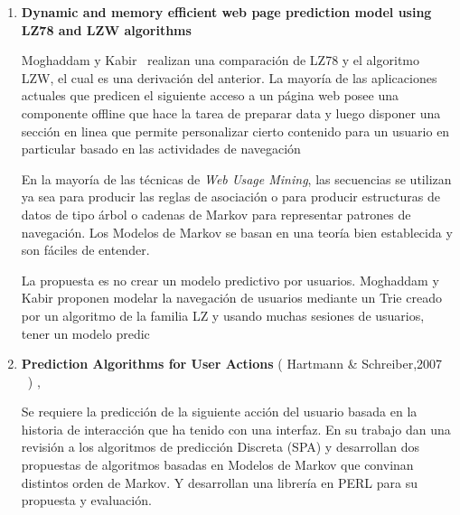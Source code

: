\vspace{1cm}
\begin{enumerate}


  \item \textbf{Dynamic and memory efficient web page prediction model using LZ78 and LZW algorithms }

	Moghaddam y Kabir~\cite{Moghaddam2009}  realizan una comparación de LZ78  y el algoritmo LZW, el cual es una derivación del anterior. La mayoría de las aplicaciones actuales que predicen el siguiente acceso a un página web posee una  componente offline que hace la tarea de preparar data y luego disponer una sección en linea que permite personalizar cierto contenido para un usuario en particular basado en las actividades de navegación
	
	En la mayoría de las técnicas de \emph{Web Usage Mining}, las secuencias se utilizan ya sea para producir las reglas de asociación o para producir estructuras de datos de tipo árbol o cadenas de Markov para representar patrones de navegación. Los  Modelos de Markov se basan en una teoría bien establecida y son fáciles de entender.  
	

	La propuesta es no crear un modelo predictivo por usuarios.
	Moghaddam y Kabir proponen modelar la navegación de usuarios mediante un Trie creado por un algoritmo de la familia LZ y usando muchas sesiones de usuarios, tener un modelo predic






  \item \textbf{Prediction Algorithms for User Actions} ( Hartmann \& Schreiber,2007  \etal~\cite{hartmann2007}) , 

	{
	Se requiere la predicción de la siguiente acción del usuario basada en la historia de interacción que ha tenido con una interfaz. 
	En su trabajo dan una revisión a los algoritmos de predicción Discreta (SPA) y desarrollan dos propuestas de algoritmos basadas en Modelos de Markov que convinan distintos orden de Markov. Y desarrollan una librería en PERL para su propuesta y evaluación.
	
	
	
}
\end{enumerate}
